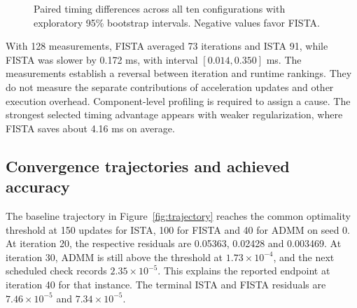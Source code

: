 \documentclass{article}
\begin{document}
\begin{figure}[htbp]\centering
{}
\caption{Paired timing differences across all ten configurations with exploratory 95\% bootstrap intervals. Negative values favor FISTA.}\label{fig:paired}
\end{figure}


With 128 measurements, FISTA averaged 73 iterations and ISTA 91, while FISTA was slower by 0.172 ms, with interval $[0.014,0.350]$ ms. The measurements establish a reversal between iteration and runtime rankings. They do not measure the separate contributions of acceleration updates and other execution overhead. Component-level profiling is required to assign a cause. The strongest selected timing advantage appears with weaker regularization, where FISTA saves about 4.16 ms on average.


\subsection{Convergence trajectories and achieved accuracy}
The baseline trajectory in Figure~\ref{fig:trajectory} reaches the common optimality threshold at 150 updates for ISTA, 100 for FISTA and 40 for ADMM on seed 0. At iteration 20, the respective residuals are 0.05363, 0.02428 and 0.003469. At iteration 30, ADMM is still above the threshold at $1.73\times10^{-4}$, and the next scheduled check records $2.35\times10^{-5}$. This explains the reported endpoint at iteration 40 for that instance. The terminal ISTA and FISTA residuals are $7.46\times10^{-5}$ and $7.34\times10^{-5}$.
\end{document}

